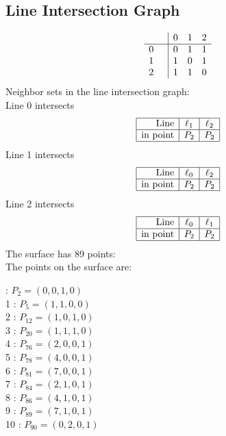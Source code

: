 \documentclass{article}
\begin{document}
{\subsection*{Line Intersection Graph}
{\arraycolsep=1pt
$$
\begin{array}{rr|*{3}r}
 &  & 0 & 1 & 2\\
\hline
0 &  & 0 & 1 & 1\\
1 &  & 1 & 0 & 1\\
2 &  & 1 & 1 & 0\\
\end{array}
$$
}%
Neighbor sets in the line intersection graph:\\
Line 0 intersects 
$$
\begin{array}{|r*{2}{|c}|}
\hline
\mbox{Line}  & \ell_{1} & \ell_{2}\\
\hline
\mbox{in point}  & P_{2} & P_{2}\\
\hline
\end{array}
$$
Line 1 intersects 
$$
\begin{array}{|r*{2}{|c}|}
\hline
\mbox{Line}  & \ell_{0} & \ell_{2}\\
\hline
\mbox{in point}  & P_{2} & P_{2}\\
\hline
\end{array}
$$
Line 2 intersects 
$$
\begin{array}{|r*{2}{|c}|}
\hline
\mbox{Line}  & \ell_{0} & \ell_{1}\\
\hline
\mbox{in point}  & P_{2} & P_{2}\\
\hline
\end{array}
$$
The surface has 89 points:\\
The points on the surface are:\\
\begin{multicols}{3}
 : $P_{2}=( 0, 0, 1, 0 )$\\
1 : $P_{5}=( 1, 1, 0, 0 )$\\
2 : $P_{12}=( 1, 0, 1, 0 )$\\
3 : $P_{20}=( 1, 1, 1, 0 )$\\
4 : $P_{76}=( 2, 0, 0, 1 )$\\
5 : $P_{78}=( 4, 0, 0, 1 )$\\
6 : $P_{81}=( 7, 0, 0, 1 )$\\
7 : $P_{84}=( 2, 1, 0, 1 )$\\
8 : $P_{86}=( 4, 1, 0, 1 )$\\
9 : $P_{89}=( 7, 1, 0, 1 )$\\
10 : $P_{90}=( 0, 2, 0, 1 )$\\

\end{multicols}}
\end{document}
